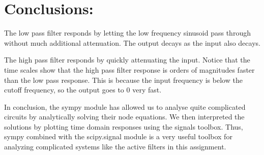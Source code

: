 \documentclass[11pt]{article}
\begin{document}
    \section{Conclusions:}\label{conclusions}

    The low pass filter responds by letting the low frequency sinusoid pass
through without much additional attenuation. The output decays as the
input also decays.

The high pass filter responds by quickly attenuating the input. Notice
that the time scales show that the high pass filter response is orders
of magnitudes faster than the low pass response. This is because the
input frequency is below the cutoff frequency, so the output goes to 0
very fast.

In conclusion, the sympy module has allowed us to analyse quite
complicated circuits by analytically solving their node equations. We
then interpreted the solutions by plotting time domain responses using
the signals toolbox. Thus, sympy combined with the scipy.signal module
is a very useful toolbox for analyzing complicated systems like the
active filters in this assignment.


    
    
    
    
\end{document}
